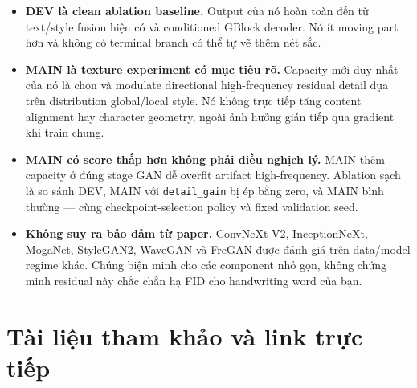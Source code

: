 \documentclass[10pt,a4paper]{article}
\begin{document}
\begin{itemize}[leftmargin=1.45em,itemsep=3pt]
  \item \textbf{DEV là clean ablation baseline.} Output của nó hoàn toàn đến từ text/style fusion hiện có và conditioned GBlock decoder. Nó ít moving part hơn và không có terminal branch có thể tự vẽ thêm nét sắc.
  \item \textbf{MAIN là texture experiment có mục tiêu rõ.} Capacity mới duy nhất của nó là chọn và modulate directional high-frequency residual detail dựa trên distribution global/local style. Nó không trực tiếp tăng content alignment hay character geometry, ngoài ảnh hưởng gián tiếp qua gradient khi train chung.
  \item \textbf{MAIN có score thấp hơn không phải điều nghịch lý.} MAIN thêm capacity ở đúng stage GAN dễ overfit artifact high-frequency. Ablation sạch là so sánh DEV, MAIN với \texttt{detail\_gain} bị ép bằng zero, và MAIN bình thường --- cùng checkpoint-selection policy và fixed validation seed.
  \item \textbf{Không suy ra bảo đảm từ paper.} ConvNeXt V2, InceptionNeXt, MogaNet, StyleGAN2, WaveGAN và FreGAN được đánh giá trên data/model regime khác. Chúng biện minh cho các component nhỏ gọn, không chứng minh residual này chắc chắn hạ FID cho handwriting word của bạn.
\end{itemize}

\section{Tài liệu tham khảo và link trực tiếp}
\end{document}
